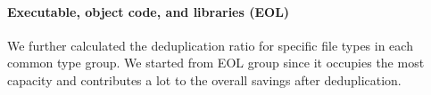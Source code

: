 %
%



\paragraph{Executable, object code, and libraries (EOL)}
We further calculated the deduplication ratio for specific file types in each common type group. We started from EOL group since it occupies the most capacity and contributes a lot to the overall savings after deduplication. 

